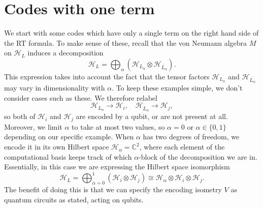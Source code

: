 \documentclass[12pt,a4paper]{report}
\numberwithin{equation}{section}
\newcommand{\ol}[1]{\overline{#1}}
\theoremstyle{definition}
\theoremstyle{theorem}
\theoremstyle{theorem}
\theoremstyle{example}
\theoremstyle{definition}
\begin{document}
\section{Codes with one term}
We start with some codes which have only a single term on the right hand side of the RT formula. To make sense of these, recall that the von Neumann algebra $M$ on $\mathcal{H}_{L}$ induces a decomposition
\begin{equation}
	\mathcal{H}_{L}=\bigoplus_{\alpha}\left(\mathcal{H}_{L_{\alpha}}\otimes\mathcal{H}_{\ol{L}_{\alpha}}\right).
\end{equation}
This expression takes into account the fact that the tensor factors $\mathcal{H}_{L_{\alpha}}$ and $\mathcal{H}_{\ol{L}_{\alpha}}$ may vary in dimensionality with $\alpha$. To keep these examples simple, we don't consider cases such as these. We therefore relabel
\begin{equation}
	\mathcal{H}_{L_{\alpha}}\to\mathcal{H}_{i},\quad\mathcal{H}_{\ol{L}_{\alpha}}\to\mathcal{H}_{j},
\end{equation}
so both of $\mathcal{H}_{i}$ and $\mathcal{H}_{j}$ are encoded by a qubit, or are not present at all. Moreover, we limit $\alpha$ to take at most two values, so $\alpha=0$ or $\alpha\in\{0,1\}$ depending on our specific example. When $\alpha$ has two degrees of freedom, we encode it in its own Hilbert space $\mathcal{H}_{\alpha}=\mathbb{C}^{2}$, where each element of the computational basis keeps track of which $\alpha$-block of the decomposition we are in. Essentially, in this case we are expressing the Hilbert space isomorphism
\begin{equation}
	\mathcal{H}_{L}=\bigoplus_{\alpha=0}^{1}\left(\mathcal{H}_{i}\otimes\mathcal{H}_{j}\right)\cong \mathcal{H}_{\alpha}\otimes\mathcal{H}_{i}\otimes\mathcal{H}_{j}.
\end{equation}
The benefit of doing this is that we can specify the encoding isometry $V$ as quantum circuits as stated, acting on qubits.
\end{document}
